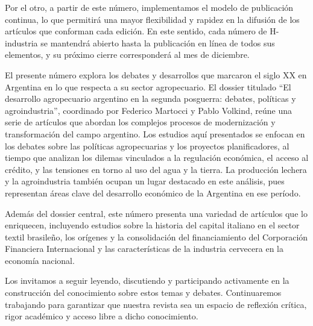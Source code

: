 Por el otro, a partir de este número, implementamos el modelo de publicación continua, lo que permitirá una mayor flexibilidad y rapidez en la difusión de los artículos que conforman cada edición. En este sentido, cada número de H-industria se mantendrá abierto hasta la publicación en línea de todos sus elementos, y su próximo cierre corresponderá al mes de diciembre.

El presente número explora los debates y desarrollos que marcaron el siglo XX en Argentina en lo que respecta a su sector agropecuario. El dossier titulado “El desarrollo agropecuario argentino en la segunda posguerra: debates, políticas y agroindustria”, coordinado por Federico Martocci y Pablo Volkind, reúne una serie de artículos que abordan los complejos procesos de modernización y transformación del campo argentino. Los estudios aquí presentados se enfocan en los debates sobre las políticas agropecuarias y los proyectos planificadores, al tiempo que analizan los dilemas vinculados a la regulación económica, el acceso al crédito, y las tensiones en torno al uso del agua y la tierra. La producción lechera y la agroindustria también ocupan un lugar destacado en este análisis, pues representan áreas clave del desarrollo económico de la Argentina en ese período.

Además del dossier central, este número presenta una variedad de artículos que lo enriquecen, incluyendo estudios sobre la historia del capital italiano en el sector textil brasileño, los orígenes y la consolidación del financiamiento del Corporación Financiera Internacional y las características de la industria cervecera en la economía nacional.

Los invitamos a seguir leyendo, discutiendo y participando activamente en la construcción del conocimiento sobre estos temas y debates. Continuaremos trabajando para garantizar que nuestra revista sea un espacio de reflexión crítica, rigor académico y acceso libre a dicho conocimiento.

